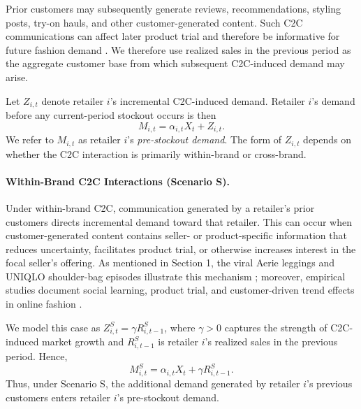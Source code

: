 \documentclass[nonblindrev,copyedit]{informs1}
\begin{document}
Prior customers may subsequently generate reviews, recommendations, styling posts, try-on hauls, and other customer-generated content. Such C2C communications can affect later product trial and therefore be informative for future fashion demand \citep[see supporting evidence in, e.g.,][]{lee2013,baardman2023}. We therefore use realized sales in the previous period as the aggregate customer base from which subsequent C2C-induced demand may arise.

Let $Z_{i,t}$ denote retailer $i$'s incremental C2C-induced demand. Retailer $i$'s demand before any current-period stockout occurs is then
\begin{equation}
M_{i,t}=\alpha_{i,t}X_t+Z_{i,t}.
\label{general}
\end{equation}
We refer to $M_{i,t}$ as retailer $i$'s \emph{pre-stockout demand}. The form of $Z_{i,t}$ depends on whether the C2C interaction is primarily within-brand or cross-brand.

\paragraph{Within-Brand C2C Interactions (Scenario S).}
Under within-brand C2C, communication generated by a retailer's prior customers directs incremental demand toward that retailer. This can occur when customer-generated content contains seller- or product-specific information that reduces uncertainty, facilitates product trial, or otherwise increases interest in the focal seller's offering. As mentioned in Section 1, the viral Aerie leggings and UNIQLO shoulder-bag episodes illustrate this mechanism \citep{businessinsider2021,guardian2023uniqlo}; moreover, empirical studies document social learning, product trial, and customer-driven trend effects in online fashion \citep[see, e.g.,][]{lee2013,baardman2023}.

We model this case as $Z_{i,t}^S=\gamma R_{i,t-1}^S$, where $\gamma>0$ captures the strength of C2C-induced market growth and $R_{i,t-1}^S$ is retailer $i$'s realized sales in the previous period. Hence,
\begin{equation}
M_{i,t}^S=\alpha_{i,t}X_t+\gamma R_{i,t-1}^S .
\label{sne}
\end{equation}
Thus, under Scenario S, the additional demand generated by retailer $i$'s previous customers enters retailer $i$'s pre-stockout demand.
\end{document}
